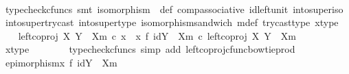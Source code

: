 \begin{isabellebody}
\ \ \ \ \isamarkupfalse%
\ {\isacharparenleft}{\kern0pt}typecheck{\isacharunderscore}{\kern0pt}cfuncs{\isacharcomma}{\kern0pt}\ smt\ {\isacartoucheopen}isomorphism\ {\isasymphi}{\isacartoucheclose}\ {\isasymphi}{\isacharunderscore}{\kern0pt}def\ comp{\isacharunderscore}{\kern0pt}associative{}\ id{\isacharunderscore}{\kern0pt}left{\isacharunderscore}{\kern0pt}unit{}\ into{\isacharunderscore}{\kern0pt}super{\isacharunderscore}{\kern0pt}iso\ into{\isacharunderscore}{\kern0pt}super{\isacharunderscore}{\kern0pt}try{\isacharunderscore}{\kern0pt}cast\ into{\isacharunderscore}{\kern0pt}super{\isacharunderscore}{\kern0pt}type\ isomorphism{\isacharunderscore}{\kern0pt}sandwich\ m{\isacharunderscore}{\kern0pt}def\ try{\isacharunderscore}{\kern0pt}cast{\isacharunderscore}{\kern0pt}type\ x{\isacharunderscore}{\kern0pt}type{\isacharparenright}{\kern0pt}\isanewline
\ \ \isamarkupfalse%
\ {\isachardoublequoteopen}left{\isacharunderscore}{\kern0pt}coproj\ X\ {\isacharparenleft}{\kern0pt}Y\ {\isasymsetminus}\ {\isacharparenleft}{\kern0pt}X{\isacharcomma}{\kern0pt}m{\isacharparenright}{\kern0pt}{\isacharparenright}{\kern0pt}\ {\isasymcirc}\isactrlsub c\ x\ {\isacharequal}{\kern0pt}\ {\isacharparenleft}{\kern0pt}x\ {\isasymbowtie}\isactrlsub f\ id{\isacharparenleft}{\kern0pt}Y\ {\isasymsetminus}\ {\isacharparenleft}{\kern0pt}X{\isacharcomma}{\kern0pt}m{\isacharparenright}{\kern0pt}{\isacharparenright}{\kern0pt}{\isacharparenright}{\kern0pt}\ {\isasymcirc}\isactrlsub c\ left{\isacharunderscore}{\kern0pt}coproj\ X\ {\isacharparenleft}{\kern0pt}Y\ {\isasymsetminus}\ {\isacharparenleft}{\kern0pt}X{\isacharcomma}{\kern0pt}m{\isacharparenright}{\kern0pt}{\isacharparenright}{\kern0pt}{\isachardoublequoteclose}\isanewline
\ \ \ \ \isamarkupfalse%
\ x{\isacharunderscore}{\kern0pt}type\ \ \isanewline
\ \ \ \ \isamarkupfalse%
\ {\isacharparenleft}{\kern0pt}typecheck{\isacharunderscore}{\kern0pt}cfuncs{\isacharcomma}{\kern0pt}\ simp\ add{\isacharcolon}{\kern0pt}\ left{\isacharunderscore}{\kern0pt}coproj{\isacharunderscore}{\kern0pt}cfunc{\isacharunderscore}{\kern0pt}bowtie{\isacharunderscore}{\kern0pt}prod{\isacharparenright}{\kern0pt}\isanewline
\ \ \isamarkupfalse%
\ {\isachardoublequoteopen}epimorphism{\isacharparenleft}{\kern0pt}x\ {\isasymbowtie}\isactrlsub f\ id{\isacharparenleft}{\kern0pt}Y\ {\isasymsetminus}\ {\isacharparenleft}{\kern0pt}X{\isacharcomma}{\kern0pt}m{\isacharparenright}{\kern0pt}{\isacharparenright}{\kern0pt}{\isacharparenright}{\kern0pt}{\isachardoublequoteclose}\isanewline

\end{isabellebody}
